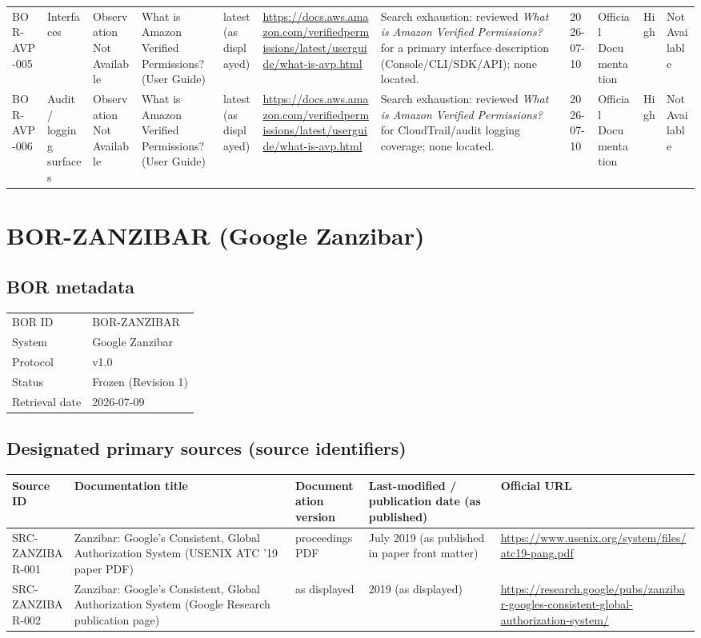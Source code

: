\documentclass[11pt]{article}
\begin{document}
\begin{longtable}{@{}L{0.95in}L{1.05in}L{2.05in}L{1.55in}L{0.95in}L{1.55in}L{1.10in}L{0.75in}L{0.95in}L{0.75in}L{0.8in}@{}}
BOR-AVP-005 & Interfaces & Observation Not Available & What is Amazon Verified Permissions? (User Guide) & latest (as displayed) & \url{https://docs.aws.amazon.com/verifiedpermissions/latest/userguide/what-is-avp.html} & Search exhaustion: reviewed \textit{What is Amazon Verified Permissions?} for a primary interface description (Console/CLI/SDK/API); none located. & 2026-07-10 & Official Documentation & High & Not Available\\
BOR-AVP-006 & Audit / logging surfaces & Observation Not Available & What is Amazon Verified Permissions? (User Guide) & latest (as displayed) & \url{https://docs.aws.amazon.com/verifiedpermissions/latest/userguide/what-is-avp.html} & Search exhaustion: reviewed \textit{What is Amazon Verified Permissions?} for CloudTrail/audit logging coverage; none located. & 2026-07-10 & Official Documentation & High & Not Available\\
\bottomrule
\end{longtable}

\section*{BOR-ZANZIBAR (Google Zanzibar)}
\subsection*{BOR metadata}
\begin{tabular}{@{}L{2.2in}L{4.2in}@{}}
\toprule
BOR ID & BOR-ZANZIBAR\\
System & Google Zanzibar\\
Protocol & v1.0\\
Status & Frozen (Revision 1)\\
Retrieval date & 2026-07-09\\
\bottomrule
\end{tabular}

\subsection*{Designated primary sources (source identifiers)}
\begin{longtable}{@{}L{1.6in}L{2.9in}L{1.0in}L{0.9in}L{1.9in}@{}}
\toprule
Source ID & Documentation title & Documentation version & Last-modified / publication date (as published) & Official URL\\
\midrule
\endhead
SRC-ZANZIBAR-001 & Zanzibar: Google’s Consistent, Global Authorization System (USENIX ATC '19 paper PDF) & proceedings PDF & July 2019 (as published in paper front matter) & \url{https://www.usenix.org/system/files/atc19-pang.pdf}\\
SRC-ZANZIBAR-002 & Zanzibar: Google’s Consistent, Global Authorization System (Google Research publication page) & as displayed & 2019 (as displayed) & \url{https://research.google/pubs/zanzibar-googles-consistent-global-authorization-system/}\\
\bottomrule
\end{longtable}
\end{document}
